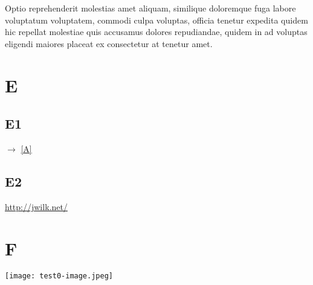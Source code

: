 \documentclass[12pt]{article}
\begin{document}
Optio reprehenderit molestias amet aliquam, similique doloremque fuga labore
voluptatum voluptatem, commodi culpa voluptas, officia tenetur expedita quidem
hic repellat molestiae quis accusamus dolores repudiandae, quidem in ad
voluptas eligendi maiores placeat ex consectetur at tenetur amet.

\newpage

\pagecolor{white}

\section{E}

\subsection{E1}

$\to$ \ref{A}

\subsection{E2}

\url{http://jwilk.net/}

\newpage

\section{F}

\texttt{[image: test0-image.jpeg]}
\end{document}
